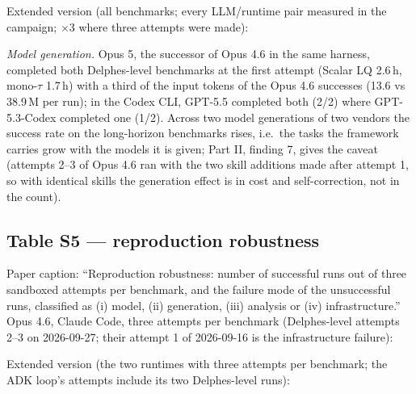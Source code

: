 \documentclass[10pt,a4paper]{article}
\begin{document}
Extended version (all benchmarks; every LLM/runtime pair measured in the campaign; $\times$3 where three attempts were made):
\begin{center}\scriptsize\setlength{\tabcolsep}{4pt}\end{center}
\emph{Model generation.} Opus 5, the successor of Opus 4.6 in the same harness, completed both Delphes-level benchmarks at the
first attempt (Scalar LQ 2.6\,h, mono-$\tau$ 1.7\,h) with a third of the input tokens of the Opus 4.6 successes (13.6 vs
38.9\,M per run); in the Codex CLI, GPT-5.5 completed both (2/2) where GPT-5.3-Codex completed one (1/2). Across two model
generations of two vendors the success rate on the long-horizon benchmarks rises, i.e.\ the tasks the framework carries grow
with the models it is given; Part II, finding 7, gives the caveat (attempts 2--3 of Opus 4.6 ran with the two skill additions
made after attempt 1, so with identical skills the generation effect is in cost and self-correction, not in the count).

\subsection*{Table S5 --- reproduction robustness}
Paper caption: ``Reproduction robustness: number of successful runs out of three sandboxed attempts per benchmark, and the
failure mode of the unsuccessful runs, classified as (i) model, (ii) generation, (iii) analysis or (iv) infrastructure.''
Opus 4.6, Claude Code, three attempts per benchmark (Delphes-level attempts 2--3 on 2026-09-27; their attempt 1 of 2026-09-16
is the infrastructure failure):
\begin{center}\small\end{center}

Extended version (the two runtimes with three attempts per benchmark; the ADK loop's attempts include its two
Delphes-level runs):
\begin{center}\scriptsize\setlength{\tabcolsep}{3pt}\end{center}

\clearpage
\end{document}
